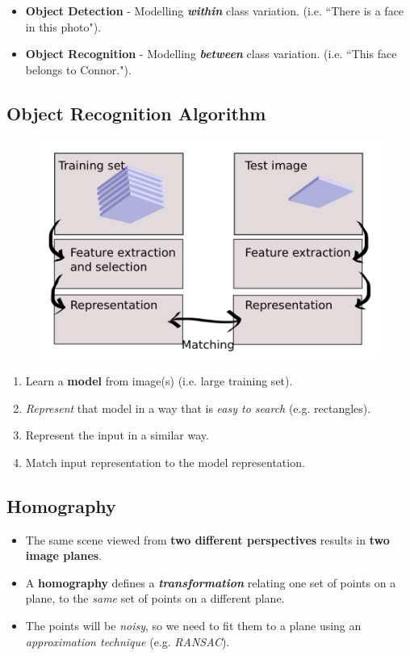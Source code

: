 \documentclass[english, 10pt]{article}
\begin{document}
\begin{itemize}
\item \textbf{Object Detection} - Modelling \textit{\textbf{within}} class variation. (i.e. ``There is a face in this photo").
\item \textbf{Object Recognition} - Modelling \textit{\textbf{between}} class variation. (i.e. ``This face belongs to Connor.").
\end{itemize}

\subsection{Object Recognition Algorithm}

\begin{figure}[ht!]      
	\centering 
	\includegraphics[scale=0.3]{recognition_framework.png}
\end{figure}

\begin{enumerate}
\item Learn a \textbf{model} from image(s) (i.e. large training set). 
\item \textit{Represent} that model in a way that is \textit{easy to search} (e.g. rectangles). 
\item Represent the input in a similar way. 
\item Match input representation to the model representation.
\end{enumerate}

\subsection{Homography}

\begin{itemize}
\item The same scene viewed from \textbf{two different perspectives} results in \textbf{two image planes}.
\item A \textbf{homography} defines a \textbf{\textit{transformation}} relating one set of points on a plane, to the \textit{same} set of points on a different plane.
\item The points will be \textit{noisy}, so we need to fit them to a plane using an \textit{approximation technique} (e.g. \textit{RANSAC}).
\end{itemize}
\end{document}
